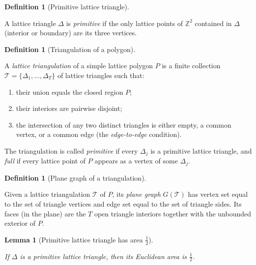 \documentclass[11pt]{article}
\providecommand{\uses}[1]{}
\providecommand{\lean}[1]{}
\newtheorem{lemma}[theorem]{Lemma}
\theoremstyle{definition}
\newtheorem{definition}[theorem]{Definition}
\begin{document}
\begin{definition}[Primitive lattice triangle]
\label{def:primitive-triangle}
\lean{Pick.LatticeTriangle.IsPrimitive}
\uses{def:lattice-triangle}
A lattice triangle $\Delta$ is \emph{primitive} if the only lattice points of
$\mathbb{Z}^2$ contained in $\Delta$ (interior or boundary) are its three
vertices.
\end{definition}

\begin{definition}[Triangulation of a polygon]
\label{def:triangulation}
\lean{Pick.Triangulation}
\uses{def:simple-polygon, def:lattice-triangle}
A \emph{lattice triangulation} of a simple lattice polygon $P$ is a finite
collection $\mathcal{T} = \{\Delta_1, \dots, \Delta_T\}$ of lattice triangles
such that:
\begin{enumerate}
\item their union equals the closed region $P$;
\item their interiors are pairwise disjoint;
\item the intersection of any two distinct triangles is either empty, a
common vertex, or a common edge (the \emph{edge-to-edge} condition).
\end{enumerate}
The triangulation is called \emph{primitive} if every $\Delta_j$ is a
primitive lattice triangle, and \emph{full} if every lattice point of $P$
appears as a vertex of some $\Delta_j$.
\end{definition}

\begin{definition}[Plane graph of a triangulation]
\label{def:plane-graph}
\lean{Pick.Triangulation.planeGraph}
\uses{def:triangulation}
Given a lattice triangulation $\mathcal{T}$ of $P$, its \emph{plane graph}
$G(\mathcal{T})$ has vertex set equal to the set of triangle vertices and
edge set equal to the set of triangle sides. Its faces (in the plane) are the
$T$ open triangle interiors together with the unbounded exterior of $P$.
\end{definition}


\begin{lemma}[Primitive lattice triangle has area $\tfrac12$]
\label{lem:primitive-triangle-area}
\lean{Pick.primitive_lattice_triangle_area}
\uses{def:primitive-triangle, def:area}
If $\Delta$ is a primitive lattice triangle, then its Euclidean area is
$\tfrac12$.
\end{lemma}
\end{document}

